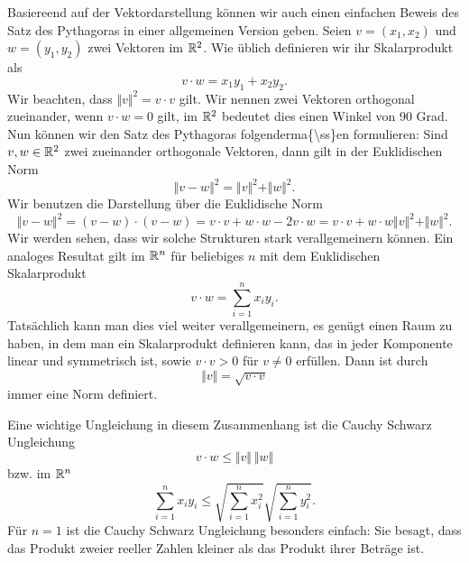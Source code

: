 Basiereend auf der Vektordarstellung können wir auch einen einfachen Beweis des Satz des Pythagoras in einer allgemeinen Version geben. Seien \(v=(x_1,x_2)\) und \(w=(y_1,y_2)\) zwei Vektoren im \(\mathbb{R}^2\). Wie üblich definieren wir ihr Skalarprodukt als
\begin{equation*}
 v \cdot w = x_1 y_1 + x_2 y_2 .\end{equation*}
Wir beachten, dass \(\Vert v \Vert^2 = v \cdot v\) gilt.
Wir nennen zwei Vektoren orthogonal zueinander, wenn \(v \cdot w = 0\) gilt, im \(\mathbb{R}^2\) bedeutet dies einen Winkel von 90 Grad.
Nun können wir den Satz des Pythagoras folgenderma\{\textbackslash{}ss\}en formulieren: Sind \(v,w \in \mathbb{R}^2\) zwei zueinander orthogonale Vektoren, dann gilt in der Euklidischen Norm
\begin{equation*}
 \Vert v - w \Vert^2 =  \Vert v \Vert^2 + \Vert w \Vert^2.\end{equation*}
Wir benutzen die Darstellung über die Euklidische Norm
\begin{equation*}
 \Vert v - w \Vert^2 = (v-w) \cdot (v-w) = v \cdot v + w\cdot w - 2 v \cdot w = v \cdot v + w\cdot w  \Vert v \Vert^2 + \Vert w \Vert^2.\end{equation*}
Wir werden sehen, dass wir solche Strukturen stark verallgemeinern können. Ein analoges Resultat gilt im \(\mathbb{R}^n\) für beliebiges \(n\) mit dem Euklidischen Skalarprodukt
\begin{equation*}
 v \cdot w = \sum_{i=1}^n x_i y_i .\end{equation*}
Tatsächlich kann man dies viel weiter verallgemeinern, es genügt einen Raum zu haben, in dem man ein Skalarprodukt definieren kann, das in jeder Komponente linear und symmetrisch ist, sowie \(v \cdot v > 0 \) für \(v \neq 0\) erfüllen.
Dann ist durch
\begin{equation*}
 \Vert v \Vert = \sqrt{ v \cdot v}\end{equation*}
immer eine Norm definiert.

Eine wichtige Ungleichung in diesem Zusammenhang ist die Cauchy Schwarz Ungleichung
\begin{equation*}
 v \cdot w \leq \Vert v \Vert~ \Vert w  \Vert
\end{equation*}
bzw. im \(\mathbb{R}^n\)
\begin{equation*}
 \sum_{i=1}^n x_i y_i \leq \sqrt{\sum_{i=1}^n x_i^2} \sqrt{\sum_{i=1}^n y_i^2} .
\end{equation*}
Für \(n=1\) ist die Cauchy Schwarz Ungleichung besonders einfach: Sie besagt, dass das Produkt zweier reeller Zahlen kleiner als das Produkt ihrer Beträge ist.

